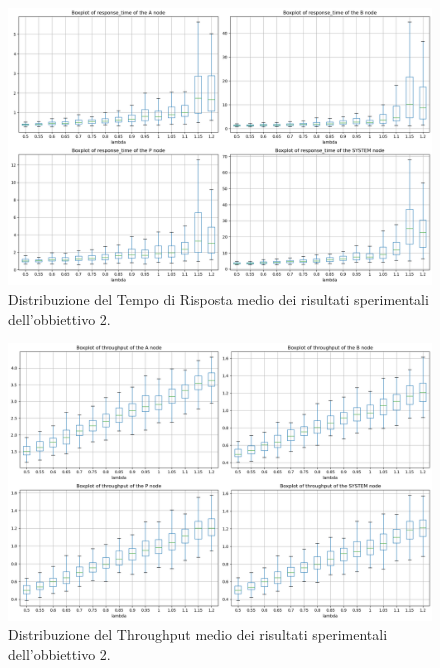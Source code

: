 \begin{figure}
    \centering
    \includegraphics[width=1\linewidth]{figs//results/obj2/simulation/obj2_boxplot_rtime.png}
    \caption{Distribuzione del Tempo di Risposta medio dei risultati sperimentali dell'obbiettivo 2.}
    \label{fig:obj2_boxplot_rtime}
\end{figure}

\begin{figure}
    \centering
    \includegraphics[width=1\linewidth]{figs/results/obj2/simulation/obj2_boxplot_throughput.png}
    \caption{Distribuzione del Throughput medio dei risultati sperimentali dell'obbiettivo 2.}
    \label{fig:obj2_boxplot_throughput}
\end{figure}

